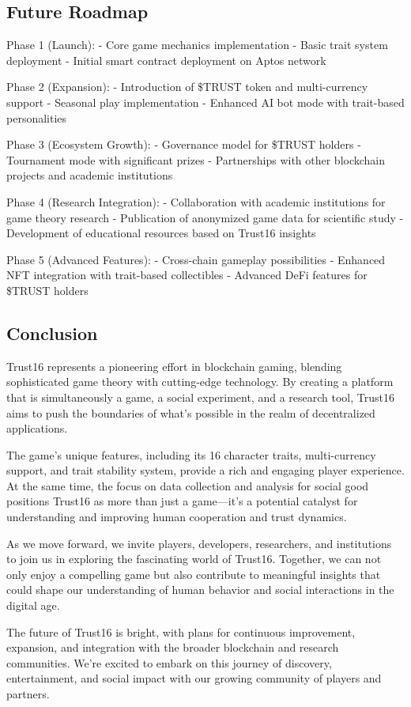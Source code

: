 \documentclass[]{article}
\begin{document}
\hypertarget{future-roadmap}{%
\subsection{Future Roadmap}\label{future-roadmap}}

Phase 1 (Launch): - Core game mechanics implementation - Basic trait
system deployment - Initial smart contract deployment on Aptos network

Phase 2 (Expansion): - Introduction of \$TRUST token and multi-currency
support - Seasonal play implementation - Enhanced AI bot mode with
trait-based personalities

Phase 3 (Ecosystem Growth): - Governance model for \$TRUST holders -
Tournament mode with significant prizes - Partnerships with other
blockchain projects and academic institutions

Phase 4 (Research Integration): - Collaboration with academic
institutions for game theory research - Publication of anonymized game
data for scientific study - Development of educational resources based
on Trust16 insights

Phase 5 (Advanced Features): - Cross-chain gameplay possibilities -
Enhanced NFT integration with trait-based collectibles - Advanced DeFi
features for \$TRUST holders

\hypertarget{conclusion}{%
\subsection{Conclusion}\label{conclusion}}

Trust16 represents a pioneering effort in blockchain gaming, blending
sophisticated game theory with cutting-edge technology. By creating a
platform that is simultaneously a game, a social experiment, and a
research tool, Trust16 aims to push the boundaries of what's possible in
the realm of decentralized applications.

The game's unique features, including its 16 character traits,
multi-currency support, and trait stability system, provide a rich and
engaging player experience. At the same time, the focus on data
collection and analysis for social good positions Trust16 as more than
just a game---it's a potential catalyst for understanding and improving
human cooperation and trust dynamics.

As we move forward, we invite players, developers, researchers, and
institutions to join us in exploring the fascinating world of Trust16.
Together, we can not only enjoy a compelling game but also contribute to
meaningful insights that could shape our understanding of human behavior
and social interactions in the digital age.

The future of Trust16 is bright, with plans for continuous improvement,
expansion, and integration with the broader blockchain and research
communities. We're excited to embark on this journey of discovery,
entertainment, and social impact with our growing community of players
and partners.
\end{document}
